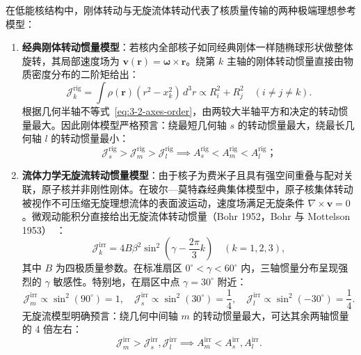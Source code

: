 在低能核结构中，刚体转动与无旋流体转动代表了核质量传输的两种极端理想参考模型：
\begin{enumerate}
\item \textbf{经典刚体转动惯量模型}：若核内全部核子如同经典刚体一样随椭球形状做整体旋转，其局部速度场为 $\mathbf{v}(\mathbf{r}) = \boldsymbol{\omega} \times \mathbf{r}$。绕第 $k$ 主轴的刚体转动惯量直接由物质密度分布的二阶矩给出：
\begin{equation}\label{eq:3-2-rigid-inertia}
\mathcal{J}_k^{\text{rig}} = \int \rho(\mathbf{r}) (r^2 - x_k^2) \, d^3r \propto R_i^2 + R_j^2 \quad (i \ne j \ne k).
\end{equation}
根据几何半轴不等式~\eqref{eq:3-2-axes-order}，由两较大半轴平方和决定的转动惯量最大。因此刚体模型严格预言：绕最短几何轴 $s$ 的转动惯量最大，绕最长几何轴 $l$ 的转动惯量最小：
\begin{equation}\label{eq:3-2-rigid-order}
\mathcal{J}_s^{\text{rig}} > \mathcal{J}_m^{\text{rig}} > \mathcal{J}_l^{\text{rig}} \implies A_s^{\text{rig}} < A_m^{\text{rig}} < A_l^{\text{rig}}；
\end{equation}
\item \textbf{流体力学无旋流转动惯量模型}：由于核子为费米子且具有强空间重叠与配对关联，原子核并非刚性刚体。在玻尔—莫特森经典集体模型中，原子核集体转动被视作不可压缩无旋理想流体的表面波运动，速度场满足无旋条件 $\nabla \times \mathbf{v} = 0$。微观动能积分直接给出无旋流体转动惯量（Bohr 1952，Bohr 与 Mottelson 1953）~\cite{bohr-1952-surface-particle-coupling,bohr-mottelson-1953-collective-individual-original}：
\begin{equation}\label{eq:3-2-irrot-inertia}
\mathcal{J}_k^{\text{irr}} = 4 B \beta^2 \sin^2\left(\gamma - \frac{2\pi}{3} k\right) \quad (k = 1, 2, 3),
\end{equation}
其中 $B$ 为四极质量参数。在标准扇区 $0^\circ < \gamma < 60^\circ$ 内，三轴惯量分布呈现强烈的 $\gamma$ 敏感性。特别地，在扇区中点 $\gamma = 30^\circ$ 附近：
\begin{equation}\label{eq:3-2-irrot-order}
\mathcal{J}_m^{\text{irr}} \propto \sin^2(90^\circ) = 1, \quad \mathcal{J}_s^{\text{irr}} \propto \sin^2(30^\circ) = \frac{1}{4}, \quad \mathcal{J}_l^{\text{irr}} \propto \sin^2(-30^\circ) = \frac{1}{4}.
\end{equation}
无旋流模型明确预言：绕几何中间轴 $m$ 的转动惯量最大，可达其余两轴惯量的 4 倍左右：
\begin{equation}
\mathcal{J}_m^{\text{irr}} > \mathcal{J}_s^{\text{irr}}, \mathcal{J}_l^{\text{irr}} \implies A_m^{\text{irr}} < A_s^{\text{irr}}, A_l^{\text{irr}}.
\end{equation}
\end{enumerate}

